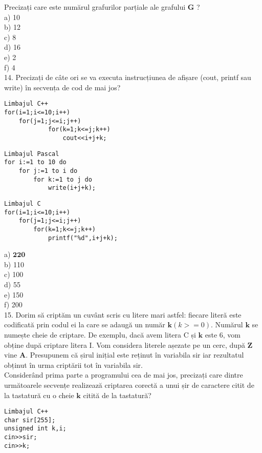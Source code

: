 Precizați care este numărul grafurilor parțiale ale grafului $\mathbf{G}$ ?\\
a) 10\\
b) 12\\
c) 8\\
d) 16\\
e) 2\\
f) 4\\
14. Precizați de câte ori se va executa instrucțiunea de afișare (cout, printf sau write) în secvența de cod de mai jos?

\begin{verbatim}
Limbajul C++
for(i=1;i<=10;i++)
    for(j=1;j<=i;j++)
            for(k=1;k<=j;k++)
                cout<<i+j+k;
\end{verbatim}

\begin{verbatim}
Limbajul Pascal
for i:=1 to 10 do
    for j:=1 to i do
        for k:=1 to j do
            write(i+j+k);
\end{verbatim}

\begin{verbatim}
Limbajul C
for(i=1;i<=10;i++)
    for(j=1;j<=i;j++)
        for(k=1;k<=j;k++)
            printf("%d",i+j+k);
\end{verbatim}

a) $\mathbf{2 2 0}$\\
b) 110\\
c) 100\\
d) 55\\
e) 150\\
f) 200\\
15. Dorim să criptăm un cuvânt scris cu litere mari astfel: fiecare literă este codificată prin codul ei la care se adaugă un număr $\mathbf{k}(k>=0)$. Numărul $\mathbf{k}$ se numește cheie de criptare. De exemplu, dacă avem litera C și $\mathbf{k}$ este 6, vom obține după criptare litera I. Vom considera literele așezate pe un cerc, după $\mathbf{Z}$ vine $\mathbf{A}$. Presupunem că șirul inițial este reținut în variabila sir iar rezultatul obținut în urma criptării tot în variabila sir.\\
Considerând prima parte a programului cea de mai jos, precizați care dintre următoarele secvențe realizează criptarea corectă a unui șir de caractere citit de la tastatură cu o cheie $\mathbf{k}$ citită de la tastatură?

\begin{verbatim}
Limbajul C++
char sir[255];
unsigned int k,i;
cin>>sir;
cin>>k;
\end{verbatim}

